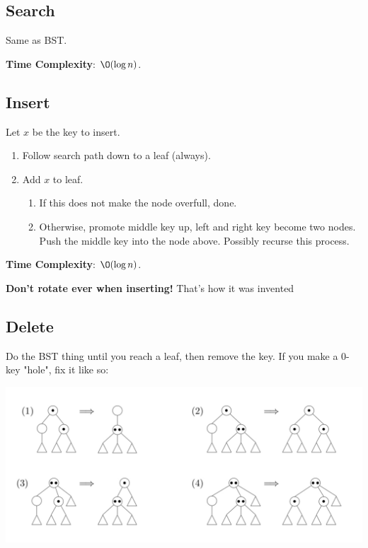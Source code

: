 \documentclass[12pt, letterpaper]{article}
\begin{document}
\begin{multicols*}{3}
        \subsection{Search}
        Same as BST.

        { \bf Time Complexity}: $\O(\log n)$.
        
        \subsection{Insert}
        Let $x$ be the key to insert.
        \begin{enumerate}
            \item Follow search path down to a leaf (always).
            \item Add $x$ to leaf.
            \begin{enumerate}[label=\roman*.]
                \item If this does not make the node overfull, done.
                \item Otherwise, promote middle key up, left and right key become two nodes. Push the middle key into the node above. Possibly recurse this process.
            \end{enumerate}
        \end{enumerate}

        { \bf Time Complexity}: $\O(\log n)$.
        
        {\bf Don't rotate ever when inserting!} That's how it was invented
        
        \subsection{Delete}
        Do the BST thing until you reach a leaf, then remove the key. If you make a 0-key "hole", fix it like so:
        
        \begin{center}
            \includegraphics[scale=0.1]{23.jpeg}
        \end{center}


\end{multicols*}
\end{document}
